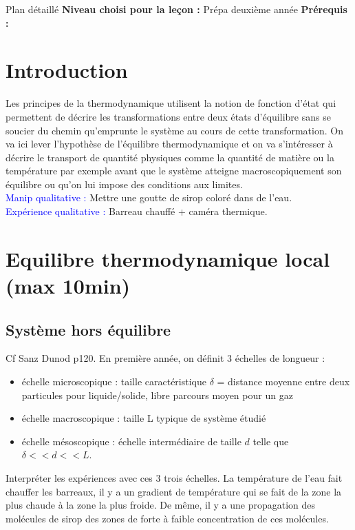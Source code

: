 \begin{reportBlock}{Plan détaillé}
  \textbf{Niveau choisi pour la leçon :} Prépa deuxième année
  \newline
  \textbf{Prérequis : }
  \newline

\section*{Introduction}
Les principes de la thermodynamique utilisent la notion de fonction d'état qui permettent de décrire les transformations entre deux états d'équilibre sans se soucier du chemin qu'emprunte le système au cours de cette transformation. On va ici lever l'hypothèse de l'équilibre thermodynamique et on va s'intéresser à décrire le transport de quantité physiques comme la quantité de matière ou la température par exemple avant que le système atteigne macroscopiquement son équilibre ou qu'on lui impose des conditions aux limites.\\

\textcolor{blue}{Manip qualitative :} Mettre une goutte de sirop coloré dans de l'eau.\\

\textcolor{blue}{Expérience qualitative :} Barreau  chauffé + caméra thermique.\\



\section{Equilibre thermodynamique local (max 10min)}

\subsection{Système hors équilibre}
Cf Sanz Dunod p120. En première année, on définit 3 échelles de longueur :
\begin{itemize}
    \item échelle microscopique : taille caractéristique $\delta$ = distance moyenne entre deux particules pour liquide/solide, libre parcours moyen pour un gaz
    \item échelle macroscopique : taille L typique de système étudié
    \item échelle mésoscopique : échelle intermédiaire de taille $d$ telle que $\delta<<d<<L$.
\end{itemize}
Interpréter les expériences avec ces 3 trois échelles. La température de l'eau fait chauffer les barreaux, il y a un gradient de température qui se fait de la zone la plus chaude à la zone la plus froide. De même, il y a une propagation des molécules de sirop des zones de forte à faible concentration de ces molécules. \\


\end{reportBlock}
